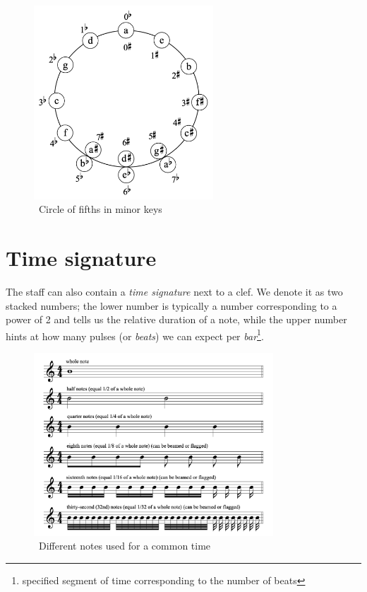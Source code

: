 \begin{figure}
    \centering
    \includegraphics[width=0.6\textwidth]{assets/circle-of-fifths-minor}
    \caption{~Circle of fifths in minor keys~\cite{music-theory}}\label{fig:circle-of-fifths-minor}
\end{figure}


\section{Time signature}\label{sec:time-signature}


The staff can also contain a \textit{time signature} next to a clef.
We denote it as two stacked numbers;
the lower number is typically a number corresponding to a power of 2 and tells us the relative duration of a note, while the upper number hints at how many pulses (or \textit{beats}) we can expect per \textit{bar}\footnote{specified segment of time corresponding to the number of beats}.~\cite{music-theory}


\begin{figure}
    \centering
    \includegraphics[width=0.8\textwidth]{assets/common-time-notes}
    \caption{~Different notes used for a common time~\cite{music-theory}}\label{fig:common-time-notes}
\end{figure}


